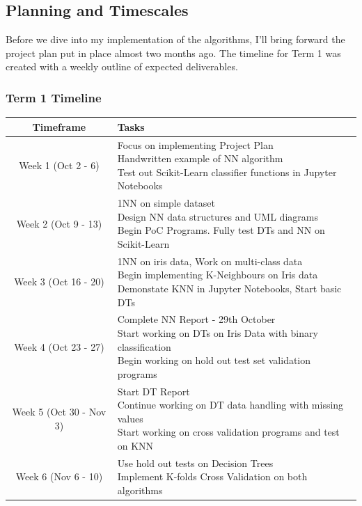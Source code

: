 \documentclass[letterpaper,10pt]{article}
\begin{document}
\subsection{Planning and Timescales}
Before we dive into my implementation of the algorithms, I'll bring forward the project plan put in place almost two months ago. The timeline for Term 1 was created with a weekly outline of expected deliverables. \par
\subsubsection{Term 1 Timeline}
\begin{tabular}{|c|p{10cm}|}
\hline
Timeframe & Tasks \\
\hline
Week 1 (Oct 2 - 6) & 
\makecell[l]{Focus on implementing Project Plan \\
Handwritten example of NN algorithm \\
Test out Scikit-Learn classifier functions in Jupyter Notebooks } \\
\hline
Week 2 (Oct 9 - 13) & 
\makecell[l]{1NN on simple dataset \\
Design NN data structures and UML diagrams \\
Begin PoC Programs. Fully test DTs and NN on Scikit-Learn} \\
\hline
Week 3 (Oct 16 - 20) & 
\makecell[l]{1NN on iris data, Work on multi-class data \\
Begin implementing K-Neighbours on Iris data \\
Demonstate KNN in Jupyter Notebooks, Start basic DTs} \\
\hline
Week 4 (Oct 23 - 27) & 
\makecell[l]{Complete NN Report - 29th October \\
Start working on DTs on Iris Data with binary classification \\
Begin working on hold out test set validation programs} \\
\hline
Week 5 (Oct 30 - Nov 3) & 
\makecell[l]{Start DT Report \\
Continue working on DT data handling with missing values \\
Start working on cross validation programs and test on KNN} \\
\hline
Week 6 (Nov 6 - 10) & 
\makecell[l]{Use hold out tests on Decision Trees \\
 Implement K-folds Cross Validation on both algorithms \\
}
\end{tabular}
\end{document}
